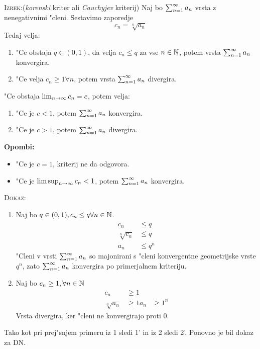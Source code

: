 \textsc{Izrek:}(\emph{korenski} kriter ali \emph{Cauchyjev} kriterij) Naj bo $\sum_{n = 1}^{\infty}a_n$ vrsta z nenegativnimi "cleni. Sestavimo zaporedje
\begin{equation*}
c_n = \sqrt[n]{a_n}
\end{equation*}
Tedaj velja:
\begin{enumerate}[1)]
	\item "Ce obstaja $q \in (0, 1)$, da velja $c_n \leq q$ za vse $n \in \mathbb{N}$, potem vrsta $\sum_{n = 1}^{\infty} a_n$ konvergira.
	\item "Ce velja $c_n \geq 1 \forall n$, potem vrsta $\sum_{n = 1}^{\infty}a_n$ divergira.
\end{enumerate}
"Ce obstaja $\lim_{n \rightarrow \infty} c_n = c$, potem velja:
\begin{enumerate}[1')]
	\item "Ce je $c < 1$, potem $\sum_{n = 1}^{\infty}a_n$ konvergira.
	\item "Ce je $c > 1$, potem $\sum_{n = 1}^{\infty}a_n$ divergira.
\end{enumerate}
\textbf{Opombi:}
\begin{itemize}
	\item "Ce je $c = 1$, kriterij ne da odgovora.
	\item "Ce je $\limsup_{n \rightarrow \infty} c_n < 1$, potem $\sum_{n = 1}^{\infty}a_n$ konvergira.
\end{itemize}
\textsc{Dokaz:}
\begin{enumerate}[1)]
	\item Naj bo $q \in (0, 1), c_n \leq q \forall n \in \mathbb{N}$.
	\begin{align*}
	c_n &\leq q \\
	\sqrt[n]{c_n} &\leq q \\
	a_n &\leq q^n
	\end{align*}
	"Cleni v vrsti $\sum_{n = 1}^{\infty}a_n$ so majonirani s "cleni konvergentne geometrijske vrste $q^n$, zato $\sum_{n = 1}^{\infty}a_n$ konvergira po primerjalnem kriteriju.
	
	\item Naj bo $c_n \geq 1, \forall n \in \mathbb{N}$
	\begin{align*}
	c_n &\geq 1 \\
	\sqrt[n]{a_n} &\geq 1
	a_n &\geq 1^n
	\end{align*}
	Vrsta divergira, ker "cleni ne konvergirajo proti 0.
\end{enumerate}
Tako kot pri prej"snjem primeru iz 1 sledi 1' in iz 2 sledi 2'. Ponovno je bil dokaz za DN.

